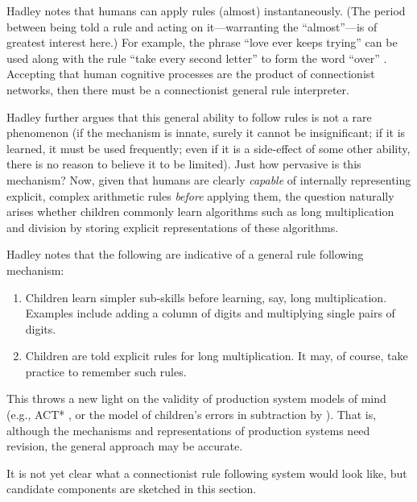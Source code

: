 Hadley notes that humans can apply rules (almost) instantaneously.
(The period between being told a rule and acting on it---warranting
the ``almost''---is of greatest interest here.) For example, the
phrase ``love ever keeps trying'' can be used along with the rule
``take every second letter'' to form the word ``over''
\cite[page 2]{hadlconn}. Accepting that human cognitive processes
are the product of connectionist networks, then there must be a
connectionist general rule interpreter.

Hadley further argues that this general ability to follow rules is not
a rare phenomenon (if the mechanism is innate, surely it cannot be
insignificant; if it is learned, it must be used frequently; even
if it is a side-effect of some other ability, there is no reason to
believe it to be limited). Just how pervasive is this mechanism?
\bssq
Now, given that humans are clearly {\em capable} of internally
representing explicit, complex arithmetic rules {\em before} applying
them, the question naturally arises whether children commonly learn
algorithms such as long multiplication and division by storing
explicit representations of these algorithms.

\hfill \cite[page 11]{hadlconn}
\essq
Hadley notes that
the following are indicative of a general rule following
mechanism:
\begin{enumerate}
\item Children learn simpler sub-skills before learning, say, long
multiplication.  Examples include adding a column of digits and
multiplying single pairs of digits.
\item Children are told explicit rules for long multiplication.  It
may, of course, take practice to remember such rules.
\end{enumerate}
This throws a new light on the validity of production system models of
mind (e.g., ACT* \cite{andearch}, or the model of
children's errors in subtraction by ). That is,
although the mechanisms and representations of production systems need
revision, the general approach may be accurate.


\label{poss}

It is not yet clear what a connectionist rule following system would
look like, but candidate components are sketched in this
section.


